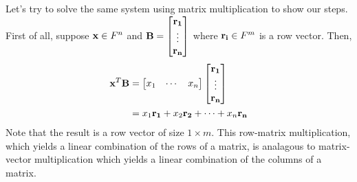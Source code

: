 \documentclass[../main.tex]{subfiles}
\begin{document}
Let's try to solve the same system using matrix multiplication to show our steps.
First of all, suppose $\mathbf{x} \in F^n$ and $\mathbf{B}=\begin{bmatrix}\mathbf{r_1}\\\vdots\\\mathbf{r_n}\end{bmatrix}$
where $\mathbf{r_i} \in F^m$ is a row vector. Then,
\begin{align*}
	\mathbf{x}^T\mathbf{B} & =\begin{bmatrix}x_1&\cdots&x_n\end{bmatrix}\begin{bmatrix}\mathbf{r_1}\\\vdots\\\mathbf{r_n}\end{bmatrix} \\
	                   & =x_1\mathbf{r_1}+x_2\mathbf{r_2}+\cdots +x_n\mathbf{r_n}
\end{align*}
Note that the result is a row vector of size $1\times m$. This row-matrix
multiplication, which yields a linear combination of the rows of a matrix,
is analagous to matrix-vector multiplication which yields a linear
combination of the columns of a matrix.
\end{document}
